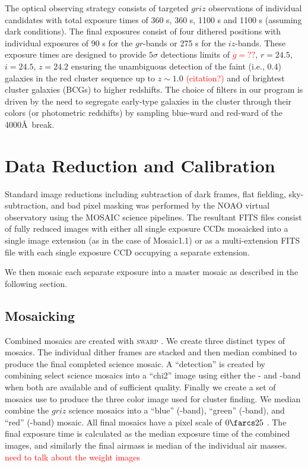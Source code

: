 \documentclass[apj, revtex4-1]{emulateapj}
\newcommand{\editorial}[1]{\textcolor{red}{#1}}
\begin{document}
The optical observing strategy consists of targeted $griz$ observations of individual candidates with total exposure times of 360 s, 360 s, 1100 s and 1100 s (assuming dark conditions). The final exposures consist of four dithered positions with individual exposures of 90 s for the $gr$-bands or 275 s for the $iz$-bands. These exposure times are designed to provide $5\sigma$ detections limits of \editorial{$g=??$}, $r = 24.5$, $i = 24.5$, $z = 24.2$ ensuring the unambiguous detection of the faint (i.e., 0.4\lstar) galaxies in the red cluster sequence up to $z \sim 1.0$ \editorial{(citation?)} and of brightest cluster galaxies (BCGs) to higher redshifts. The choice of filters in our program is driven by the need to segregate early-type galaxies in the cluster through their colors (or photometric redshifts) by sampling blue-ward and red-ward of the 4000\AA\ break.

\section{Data Reduction and Calibration}\label{sec:data reduction}
Standard image reductions including subtraction of dark frames, flat fielding, sky-subtraction, and bad pixel masking was performed by the NOAO virtual observatory using the MOSAIC \citep{Valdes2007} science pipelines. The resultant FITS files consist of fully reduced images with either all single exposure CCDs mosaicked into a single image extension (as in the case of Mosaic1.1) or as a multi-extension FITS file with each single exposure CCD occupying a separate extension.

We then mosaic each separate exposure into a master mosaic as described in the following section.

\subsection{Mosaicking}\label{sec:mosaicks}
Combined mosaics are created with \textsc{swarp} \citep{Bertin2002}. We create three distinct types of mosaics. The individual dither frames are stacked and then median combined to produce the final completed science mosaic. A ``detection'' is created by combining select science mosaics into a ``chi2'' image using either the \sdssi- and \sdssz-band when both are available and of sufficient quality. Finally we create a set of mosaics use to produce the three color image used for cluster finding. We median combine the $griz$ science mosaics into a ``blue'' (\sdssg-band), ``green'' (\sdssr-band), and ``red'' (\sdssi\sdssz-band) mosaic. All final mosaics have a pixel scale of $0\farcs25$ \perpixel. The final exposure time is calculated as the median exposure time of the combined images, and similarly the final airmass is median of the individual air masses. \editorial{need to talk about the weight images}
\end{document}
